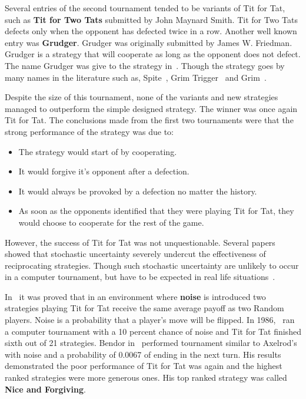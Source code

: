 \documentclass{article}
\theoremstyle{definition}
\begin{document}
Several entries of the second tournament tended to be variants of Tit for Tat, such as
\textbf{Tit for Two Tats} submitted by John Maynard Smith. Tit for Two
Tats defects only when the opponent has defected twice in a row. Another well
known entry was \textbf{Grudger}.
Grudger was originally submitted by James W. Friedman. Grudger is a strategy that
will cooperate as long as the opponent does not defect. The name Grudger was give
to the strategy in~\cite{Li2014}. Though the strategy goes by many names in the
literature such as, Spite~\cite{Beaufils1997}, Grim Trigger~\cite{Banks1990} and
Grim~\cite{Van2015}.

Despite the size of this tournament, none of the variants and new strategies managed
to outperform the simple designed strategy. The winner was once again Tit for Tat.
The conclusions made from the first two tournaments were that the strong performance
of the strategy was due to:

\begin{itemize}
    \item The strategy would start of by cooperating.
    \item It would forgive it's opponent after a defection.
    \item It would always be provoked by a defection no matter the history.
    \item As soon as the opponents identified that they were playing Tit for Tat,
    they would choose to cooperate for the rest of the game.
\end{itemize}

However, the success of Tit for Tat was not unquestionable. Several papers
showed that  stochastic uncertainty severely undercut the effectiveness
of reciprocating strategies. Though such stochastic uncertainty
are unlikely to occur in a computer tournament, but have to be expected in real
life situations~\cite{Milinski1987}.

In~\cite{Molander1985} it was proved that
in an environment where \textbf{noise} is introduced two strategies playing Tit
for Tat receive the same average payoff as two Random players. Noise is a probability
that a player's move will be flipped. In 1986,~\cite{Donninger1986} ran a computer
tournament with a 10 percent chance of noise and Tit for Tat finished sixth out of
21 strategies. Bendor in~\cite{Bendor1991} performed tournament similar to Axelrod's
with noise and a probability of 0.0067 of ending in the next turn.
His results demonstrated the poor performance of Tit for Tat was again and the highest
ranked strategies were more generous ones. His top ranked strategy was called
\textbf{Nice and Forgiving}.
\end{document}
